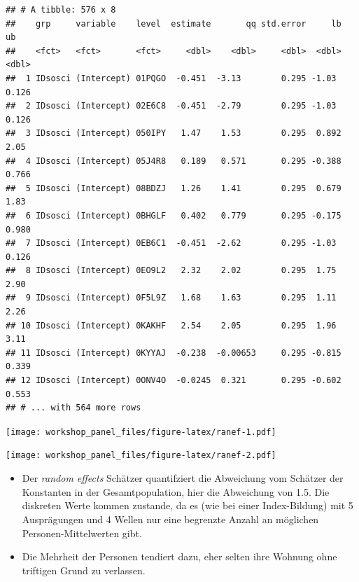 \documentclass[
]{book}
\newenvironment{Shaded}{\begin{snugshade}}{\end{snugshade}}
\newcommand{\CommentTok}[1]{\textcolor[rgb]{0.56,0.35,0.01}{\textit{#1}}}
\newcommand{\DataTypeTok}[1]{\textcolor[rgb]{0.13,0.29,0.53}{#1}}
\newcommand{\DecValTok}[1]{\textcolor[rgb]{0.00,0.00,0.81}{#1}}
\newcommand{\FloatTok}[1]{\textcolor[rgb]{0.00,0.00,0.81}{#1}}
\newcommand{\KeywordTok}[1]{\textcolor[rgb]{0.13,0.29,0.53}{\textbf{#1}}}
\newcommand{\NormalTok}[1]{#1}
\newcommand{\OperatorTok}[1]{\textcolor[rgb]{0.81,0.36,0.00}{\textbf{#1}}}
\newcommand{\StringTok}[1]{\textcolor[rgb]{0.31,0.60,0.02}{#1}}
\providecommand{\tightlist}{%
  \setlength{\itemsep}{0pt}\setlength{\parskip}{0pt}}
\begin{document}
\begin{verbatim}
## # A tibble: 576 x 8
##    grp     variable    level  estimate       qq std.error     lb    ub
##    <fct>   <fct>       <fct>     <dbl>    <dbl>     <dbl>  <dbl> <dbl>
##  1 IDsosci (Intercept) 01PQGO  -0.451  -3.13        0.295 -1.03  0.126
##  2 IDsosci (Intercept) 02E6C8  -0.451  -2.79        0.295 -1.03  0.126
##  3 IDsosci (Intercept) 050IPY   1.47    1.53        0.295  0.892 2.05 
##  4 IDsosci (Intercept) 05J4R8   0.189   0.571       0.295 -0.388 0.766
##  5 IDsosci (Intercept) 08BDZJ   1.26    1.41        0.295  0.679 1.83 
##  6 IDsosci (Intercept) 0BHGLF   0.402   0.779       0.295 -0.175 0.980
##  7 IDsosci (Intercept) 0EB6C1  -0.451  -2.62        0.295 -1.03  0.126
##  8 IDsosci (Intercept) 0EO9L2   2.32    2.02        0.295  1.75  2.90 
##  9 IDsosci (Intercept) 0F5L9Z   1.68    1.63        0.295  1.11  2.26 
## 10 IDsosci (Intercept) 0KAKHF   2.54    2.05        0.295  1.96  3.11 
## 11 IDsosci (Intercept) 0KYYAJ  -0.238  -0.00653     0.295 -0.815 0.339
## 12 IDsosci (Intercept) 0ONV4O  -0.0245  0.321       0.295 -0.602 0.553
## # ... with 564 more rows
\end{verbatim}

\texttt{[image: workshop\_panel\_files/figure-latex/ranef-1.pdf]}

\begin{Shaded}
\end{Shaded}

\texttt{[image: workshop\_panel\_files/figure-latex/ranef-2.pdf]}

\begin{itemize}
\tightlist
\item
  Der \emph{random effects} Schätzer quantifziert die Abweichung vom Schätzer der Konstanten in der Gesamtpopulation, hier die Abweichung von 1.5. Die diskreten Werte kommen zustande, da es (wie bei einer Index-Bildung) mit 5 Ausprägungen und 4 Wellen nur eine begrenzte Anzahl an möglichen Personen-Mittelwerten gibt.
\item
  Die Mehrheit der Personen tendiert dazu, eher selten ihre Wohnung ohne triftigen Grund zu verlassen.
\end{itemize}
\end{document}
